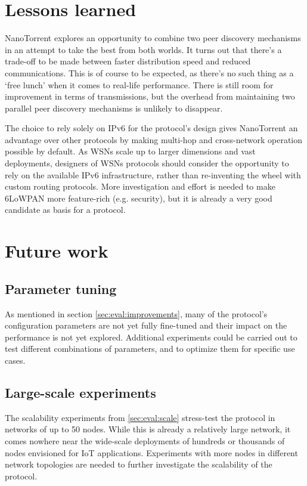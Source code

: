 \section{Lessons learned}
\label{sec:conc:lessons}
NanoTorrent explores an opportunity to combine two peer discovery mechanisms in an attempt to take the best from both worlds. It turns out that there's a trade-off to be made between faster distribution speed and reduced communications. This is of course to be expected, as there's no such thing as a `free lunch' when it comes to real-life performance. There is still room for improvement in terms of transmissions, but the overhead from maintaining two parallel peer discovery mechanisms is unlikely to disappear.

The choice to rely solely on \gls{IPv6} for the protocol's design gives NanoTorrent an advantage over other protocols by making multi-hop and cross-network operation possible by default. As \glspl{WSN} scale up to larger dimensions and vast deployments, designers of \glspl{WSN} protocols should consider the opportunity to rely on the available \gls{IPv6} infrastructure, rather than re-inventing the wheel with custom routing protocols. More investigation and effort is needed to make \gls{6LoWPAN} more feature-rich (e.g. security), but it is already a very good candidate as basis for a protocol.

\section{Future work}
\label{sec:conc:future}

\subsection{Parameter tuning}
As mentioned in section \ref{sec:eval:improvements}, many of the protocol's configuration parameters are not yet fully fine-tuned and their impact on the performance is not yet explored. Additional experiments could be carried out to test different combinations of parameters, and to optimize them for specific use cases.

\subsection{Large-scale experiments}
The scalability experiments from \ref{sec:eval:scale} stress-test the protocol in networks of up to 50 nodes. While this is already a relatively large network, it comes nowhere near the wide-scale deployments of hundreds or thousands of nodes envisioned for \gls{IoT} applications. Experiments with more nodes in different network topologies are needed to further investigate the scalability of the protocol.

